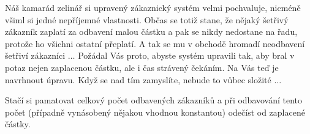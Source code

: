 \begin{cviceni} Náš kamarád zelinář si upravený zákaznický systém velmi pochvaluje, nicméně všiml si jedné nepříjemné vlastnosti.
Občas se totiž stane, že nějaký šetřivý zákazník zaplatí za odbavení malou částku a pak se nikdy nedostane na řadu, protože ho
všichni ostatní přeplatí. A tak se mu v obchodě hromadí neodbavení šetřiví zákazníci $\ldots$ Požádal Vás proto, abyste systém
upravili tak, aby bral v potaz nejen zaplacenou částku, ale i čas strávený čekáním. Na Vás teď je navrhnout úpravu. Když se nad
tím zamyslíte, nebude to vůbec složité $\ldots$
\end{cviceni}

\begin{reseni}
Stačí si pamatovat celkový počet odbavených zákazníků a při odbavování tento počet (případně vynásobený nějakou vhodnou konstantou)
odečíst od zaplacené částky. 
\end{reseni}

\ifx\ucebnice\undefined

\fi